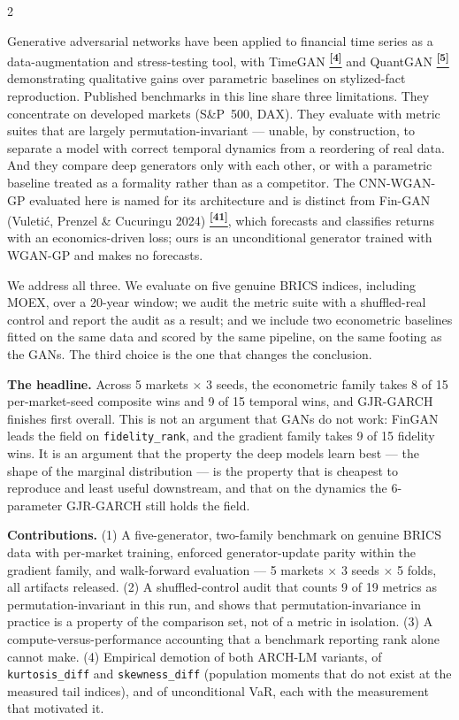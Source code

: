 \documentclass[10pt]{article}
\newcommand{\tcite}[1]{%
  \hyperlink{R:#1}{\textsuperscript{\scriptsize\textbf{[#1]}}}}
\begin{document}
\begin{multicols}{2}

\small
Generative adversarial networks have been applied to financial time series as a data-augmentation and stress-testing tool, with TimeGAN\tcite{4} and QuantGAN\tcite{5} demonstrating qualitative gains over parametric baselines on stylized-fact reproduction. Published benchmarks in this line share three limitations. They concentrate on developed markets (S\&P~500, DAX). They evaluate with metric suites that are largely permutation-invariant --- unable, by construction, to separate a model with correct temporal dynamics from a reordering of real data. And they compare deep generators only with each other, or with a parametric baseline treated as a formality rather than as a competitor. The CNN-WGAN-GP evaluated here is named for its architecture and is distinct from Fin-GAN (Vuleti\'{c}, Prenzel \& Cucuringu 2024)\tcite{41}, which forecasts and classifies returns with an economics-driven loss; ours is an unconditional generator trained with WGAN-GP and makes no forecasts.

We address all three. We evaluate on five genuine BRICS indices, including MOEX, over a 20-year window; we audit the metric suite with a shuffled-real control and report the audit as a result; and we include two econometric baselines fitted on the same data and scored by the same pipeline, on the same footing as the GANs. The third choice is the one that changes the conclusion.

\textbf{The headline.} Across 5 markets $\times$ 3 seeds, the econometric family takes 8 of 15 per-market-seed composite wins and 9 of 15 temporal wins, and GJR-GARCH finishes first overall. This is not an argument that GANs do not work: FinGAN leads the field on \texttt{fidelity\_rank}, and the gradient family takes 9 of 15 fidelity wins. It is an argument that the property the deep models learn best --- the shape of the marginal distribution --- is the property that is cheapest to reproduce and least useful downstream, and that on the dynamics the 6-parameter GJR-GARCH still holds the field.

\textbf{Contributions.} (1) A five-generator, two-family benchmark on genuine BRICS data with per-market training, enforced generator-update parity within the gradient family, and walk-forward evaluation --- 5 markets $\times$ 3 seeds $\times$ 5 folds, all artifacts released. (2) A shuffled-control audit that counts 9 of 19 metrics as permutation-invariant in this run, and shows that permutation-invariance in practice is a property of the comparison set, not of a metric in isolation. (3) A compute-versus-performance accounting that a benchmark reporting rank alone cannot make. (4) Empirical demotion of both ARCH-LM variants, of \texttt{kurtosis\_diff} and \texttt{skewness\_diff} (population moments that do not exist at the measured tail indices), and of unconditional VaR, each with the measurement that motivated it.

\end{multicols}
\end{document}
